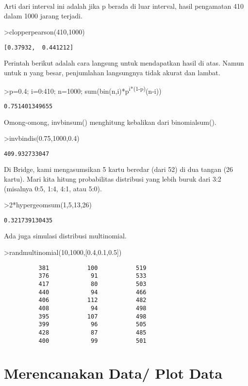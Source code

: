 \documentclass[
]{book}
\begin{document}
Arti dari interval ini adalah jika p berada di luar interval, hasil pengamatan 410 dalam 1000 jarang terjadi.

\textgreater clopperpearson(410,1000)

\begin{verbatim}
[0.37932,  0.441212]
\end{verbatim}

Perintah berikut adalah cara langsung untuk mendapatkan hasil di atas. Namun untuk n yang besar, penjumlahan langsungnya tidak akurat dan lambat.

\textgreater p=0.4; i=0:410; n=1000; sum(bin(n,i)*p\textsuperscript{i*(1-p)}(n-i))

\begin{verbatim}
0.751401349655
\end{verbatim}

Omong-omong, invbinsum() menghitung kebalikan dari binomialsum().

\textgreater invbindis(0.75,1000,0.4)

\begin{verbatim}
409.932733047
\end{verbatim}

Di Bridge, kami mengasumsikan 5 kartu beredar (dari 52) di dua tangan (26 kartu). Mari kita hitung probabilitas distribusi yang lebih buruk dari 3:2 (misalnya 0:5, 1:4, 4:1, atau 5:0).

\textgreater2*hypergeomsum(1,5,13,26)

\begin{verbatim}
0.321739130435
\end{verbatim}

Ada juga simulasi distribusi multinomial.

\textgreater randmultinomial(10,1000,{[}0.4,0.1,0.5{]})

\begin{verbatim}
          381           100           519 
          376            91           533 
          417            80           503 
          440            94           466 
          406           112           482 
          408            94           498 
          395           107           498 
          399            96           505 
          428            87           485 
          400            99           501 
\end{verbatim}

\chapter{Merencanakan Data/ Plot Data}\label{merencanakan-data-plot-data}
\end{document}
